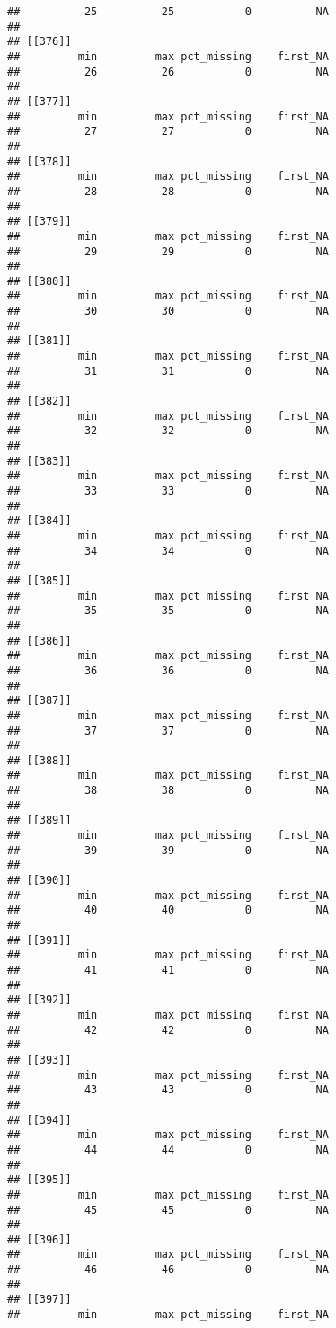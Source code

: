 \documentclass[
]{article}
\begin{document}
\begin{verbatim}
##          25          25           0          NA 
## 
## [[376]]
##         min         max pct_missing    first_NA 
##          26          26           0          NA 
## 
## [[377]]
##         min         max pct_missing    first_NA 
##          27          27           0          NA 
## 
## [[378]]
##         min         max pct_missing    first_NA 
##          28          28           0          NA 
## 
## [[379]]
##         min         max pct_missing    first_NA 
##          29          29           0          NA 
## 
## [[380]]
##         min         max pct_missing    first_NA 
##          30          30           0          NA 
## 
## [[381]]
##         min         max pct_missing    first_NA 
##          31          31           0          NA 
## 
## [[382]]
##         min         max pct_missing    first_NA 
##          32          32           0          NA 
## 
## [[383]]
##         min         max pct_missing    first_NA 
##          33          33           0          NA 
## 
## [[384]]
##         min         max pct_missing    first_NA 
##          34          34           0          NA 
## 
## [[385]]
##         min         max pct_missing    first_NA 
##          35          35           0          NA 
## 
## [[386]]
##         min         max pct_missing    first_NA 
##          36          36           0          NA 
## 
## [[387]]
##         min         max pct_missing    first_NA 
##          37          37           0          NA 
## 
## [[388]]
##         min         max pct_missing    first_NA 
##          38          38           0          NA 
## 
## [[389]]
##         min         max pct_missing    first_NA 
##          39          39           0          NA 
## 
## [[390]]
##         min         max pct_missing    first_NA 
##          40          40           0          NA 
## 
## [[391]]
##         min         max pct_missing    first_NA 
##          41          41           0          NA 
## 
## [[392]]
##         min         max pct_missing    first_NA 
##          42          42           0          NA 
## 
## [[393]]
##         min         max pct_missing    first_NA 
##          43          43           0          NA 
## 
## [[394]]
##         min         max pct_missing    first_NA 
##          44          44           0          NA 
## 
## [[395]]
##         min         max pct_missing    first_NA 
##          45          45           0          NA 
## 
## [[396]]
##         min         max pct_missing    first_NA 
##          46          46           0          NA 
## 
## [[397]]
##         min         max pct_missing    first_NA 

\end{verbatim}
\end{document}
